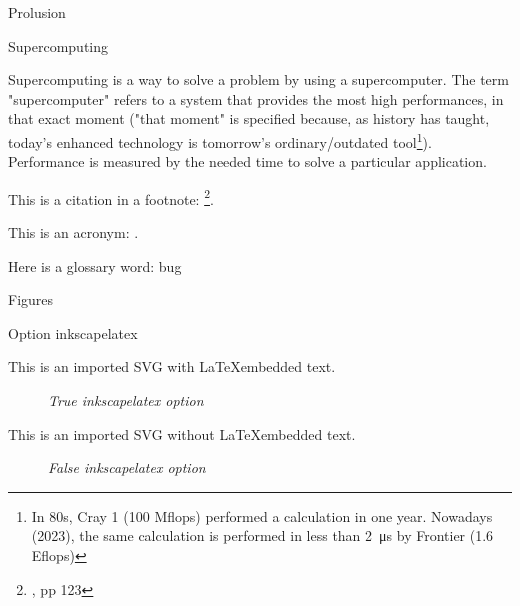\begin{chapter}{Prolusion}
    \begin{section}{Supercomputing}
        \par Supercomputing is a way to solve a problem by using a supercomputer. The term "supercomputer" refers to a system that provides the most high performances, in that exact moment ("that moment" is specified because, as history has taught, today's enhanced technology is tomorrow's ordinary/outdated tool\footnote{In 80s, Cray 1 (100 Mflops) performed a calculation in one year. Nowadays (2023), the same calculation is performed in less than \SI{2}{\micro\second} by Frontier (1.6 Eflops)}). Performance is measured by the needed time to solve a particular application.
        \par This is a citation in a footnote: \footnote{\cite{martin2009clean}, pp 123}.
        \par This is an acronym: .
        \par Here is a glossary word: \gls{bug}
    \end{section}
    \newpage
    \begin{section}{Figures}
    	\begin{subsection}{Option inkscapelatex}
		\par This is an imported SVG with \LaTeX embedded text.
		\begin{figure}[ht]
			\centering
			
			\caption{\emph{True inkscapelatex option}}
			\label{fig:latexembedded}
		\end{figure}
		\par This is an imported SVG without \LaTeX embedded text.
		\begin{figure}[ht]
			\centering
			
			\caption{\emph{False inkscapelatex option}}
			\label{fig:latexnotembedded}
		\end{figure}
	\end{subsection}
    \end{section}
\end{chapter}